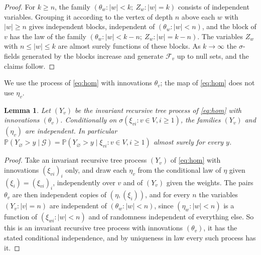 \documentclass[11pt]{amsart}
\newtheorem{lemma}[theorem]{Lemma}
\theoremstyle{remark}
\newcommand{\Ga}{\mathcal{G}}
\newcommand{\cF}{\mathcal{F}}
\newcommand{\Pb}{\mathbb{P}}
\begin{document}
\begin{proof}
For $k\ge n$, the family $(\theta_w:|w|<k;\ Z_w:|w|=k)$ consists of independent variables.
Grouping it according to the vertex of depth $n$ above each $w$ with $|w|\ge n$ gives
independent blocks, independent of $(\theta_w:|w|<n)$, and the block of $v$ has the law of
the family $(\theta_w:|w|<k-n;\ Z_w:|w|=k-n)$. The variables $Z_w$ with $n\le|w|\le k$ are
almost surely functions of these blocks. As $k\to\infty$ the $\sigma$-fields generated by
the blocks increase and generate $\cF_v$ up to null sets, and the claims follow.
\end{proof}

We use the process of \eqref{eq:hom} with innovations $\theta_v$; the map of \eqref{eq:hom}
does not use $\eta_v$.

\begin{lemma}\label{lem:eta}
Let $(Y_v)$ be the invariant recursive tree process of \eqref{eq:hom} with innovations
$(\theta_v)$. Conditionally on $\sigma(\xi_{vi}:v\in V,i\ge1)$, the families $(Y_v)$ and
$(\eta_v)$ are independent. In particular
$\Pb(Y_\varnothing>y\mid\Ga)=\Pb(Y_\varnothing>y\mid \xi_{vi}: v\in V, i\ge 1)$ almost
surely for every $y$.
\end{lemma}

\begin{proof}
Take an invariant recursive tree process $(Y_v)$ of \eqref{eq:hom} with innovations
$(\xi_{vi})_i$ only, and draw each $\eta_v$ from the conditional law of $\eta$ given
$(\xi_i)=(\xi_{vi})_i$, independently over $v$ and of $(Y_v)$ given the weights. The
pairs $\theta_v$ are then independent copies of $(\eta,(\xi_i))$, and for every $n$ the
variables $(Y_v:|v|=n)$ are independent of $(\theta_w:|w|<n)$, since $(\eta_w:|w|<n)$ is a
function of $(\xi_{wi}:|w|<n)$ and of randomness independent of everything else. So this
is an invariant recursive tree process with innovations $(\theta_v)$, it has the stated
conditional independence, and by uniqueness in law every such process has it.
\end{proof}
\end{document}
